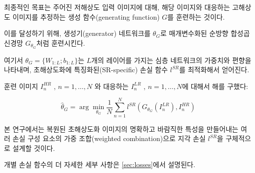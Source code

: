 \documentclass[10pt,twocolumn,letterpaper]{article}
\newcommand{\kor}[1]{#1}
\newcommand{\eng}[1]{}
\newcommand{\summary}[1]{}
\begin{document}
\summary{
단일 이미지 초해상도화의 목표와 과정에 대한 설명
}

\eng{
Our ultimate goal is to train a generating function $G$ that estimates for a given \ac{LR} input image its corresponding \ac{HR} counterpart.
}\kor{
최종적인 목표는 주어진 \ac{저해상도} 입력 이미지에 대해, 해당 이미지와 대응하는 \ac{고해상도} 이미지를 추정하는 생성 함수(generating function) $G$를 훈련하는 것이다.
} \eng{
To achieve this, we train a generator network as a feed-forward \ac{CNN} $G_{\theta_G}$ parametrized by ${\theta_G}$.
}\kor{
이를 달성하기 위해, 생성기(generator) 네트워크를  ${\theta_G}$로 매개변수화된 순방향 \ac{합성곱 신경망} $G_{\theta_G}$처럼 훈련시킨다.
} \eng{
Here ${\theta_G}=\{W_{1:L}; b_{1:L}\}$ denotes the weights and biases of a $L$-layer deep network and is obtained by optimizing a SR-specific loss function $l^{SR}$.
}\kor{
여기서 ${\theta_G}=\{W_{1:L}; b_{1:L}\}$는 $L$개의 레이어를 가지는 심층 네트워크의 가중치와 편향을 나타내며, 초해상도화에 특징화된(SR-specific) 손실 함수 $l^{SR}$를 최적화해서 얻어진다.
} \eng{
For training images $I^{HR}_n$ , $n = 1,\dots,N$ with corresponding $I^{LR}_n$ , $n = 1,\dots,N$, we solve:
}\kor{
훈련 이미지 $I^{HR}_n$ , $n = 1,\dots,N$ 와 대응하는 $I^{LR}_n$ , $n = 1,\dots,N$에 대해서 해를 구했다:
}
\begin{equation}
\hat{{\theta}}_G = \arg\min_{\theta_G} \frac{1}{N} \sum_{n=1}^{N}{l^{SR}(G_{\theta_G}(I^{LR}_n),I^{HR}_n)}
\end{equation}

\summary{
저해상도 입력 이미지에서 고해상도 이미지를 생성하는 생성 함수 $G$를 이용한 네트워크 훈련
}

\eng{
In this work we will specifically design a perceptual loss $l^{SR}$ as a weighted combination of several loss components that model distinct desirable characteristics of the recovered \ac{SR} image.
}\kor{
본 연구에서는 복원된 \ac{초해상도화} 이미지의 명확하고 바람직한 특성을 만들어내는 여러 손실 구성 요소의 가중 조합(weighted combination)으로 지각 손실 $l^{SR}$을 구체적으로 설계할 것이다.
} \eng{
The individual loss functions are described in more detail in Section \ref{sec:losses}.
}\kor{
개별 손실 함수의 더 자세한 세부 사항은 \ref{sec:losses}에서 설명된다.
}

\summary{
복원된 이미지가 바람직한 특성을 가질 수 있게하는 손실 함수 설계
}
\end{document}
